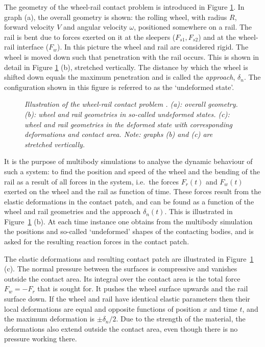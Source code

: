 \documentclass[12pt]{report}
\begin{document}
The geometry of the wheel-rail contact problem is introduced in Figure
\ref{fig:bent_rail}. In graph (a), the overall geometry is shown: the
rolling wheel, with radius $R$, forward velocity $V$ and angular velocity
$\omega$, positioned somewhere on a rail. The rail is bent due to forces
exerted on it at the sleepers ($F_{s1}, F_{s2}$) and at the wheel-rail
interface ($F_w$). In this picture the wheel and rail are considered rigid.
The wheel is moved down such that penetration with the rail occurs. This is
shown in detail in Figure \ref{fig:bent_rail} (b), stretched vertically.
The distance by which the wheel is shifted down equals the maximum
penetration and is called the {\em approach\/}, $\delta_n$. The configuration
shown in this figure is referred to as the `undeformed state'.

\begin{figure}[bt]
\centering
{}
\caption{\em Illustration of the wheel-rail contact problem 
\cite{Vollebregt2012a-quasistd}. (a): overall geometry. (b): wheel and rail
geometries in so-called undeformed states. (c): wheel and rail geometries
in the deformed state with corresponding deformations and contact area.
Note: graphs (b) and (c) are stretched vertically.}
\label{fig:bent_rail}
\end{figure}

It is the purpose of multibody simulations to analyse the dynamic behaviour
of such a system: to find the position and speed of the wheel and the bending
of the rail as a result of all forces in the system, i.e.\
the forces $F_r(t)$ and $F_w(t)$ exerted on the wheel and the rail as
function of time. These forces result from the elastic deformations in the
contact patch, and can be found as a function of the wheel and rail
geometries and the approach $\delta_n(t)$. This is illustrated in
Figure~\ref{fig:bent_rail} (b). At each time instance one obtains from the
multibody simulation the positions and so-called `undeformed' shapes of
the contacting bodies, and is asked for the resulting reaction forces in
the contact patch.

The elastic deformations and resulting contact patch are illustrated in
Figure~\ref{fig:bent_rail} (c). The normal pressure between the surfaces is
compressive and vanishes outside the contact area. Its integral over the
contact area is the total force $F_w=-F_r$ that is sought for. It pushes
the wheel surface upwards and the rail surface down. If the wheel and rail
have identical elastic parameters then their local deformations are equal
and opposite functions of position $x$ and time $t$, and the maximum
deformation is $\pm\delta_n/2$. Due to the strength of the material, the
deformations also extend outside the contact area, even though there is no
pressure working there.
\end{document}
